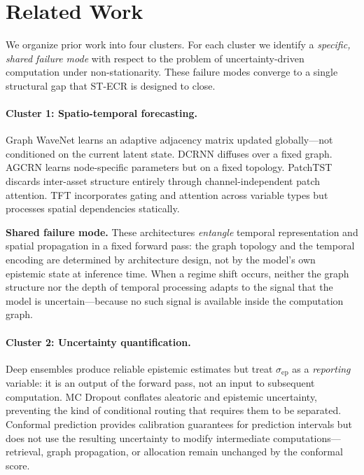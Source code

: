 \documentclass[11pt,a4paper]{article}
\newcommand{\sep}{\sigma_{\mathrm{ep}}}
\begin{document}
\section{Related Work}
\label{sec:related}

We organize prior work into four clusters.  For each cluster we identify a
\emph{specific, shared failure mode} with respect to the problem of
uncertainty-driven computation under non-stationarity.  These failure modes
converge to a single structural gap that ST-ECR is designed to close.

\paragraph{Cluster 1: Spatio-temporal forecasting.}
Graph WaveNet \citep{wu2019gwn} learns an adaptive adjacency matrix updated
globally—not conditioned on the current latent state.
DCRNN \citep{li2018dcrnn} diffuses over a fixed graph.
AGCRN \citep{bai2020agcrn} learns node-specific parameters but on a fixed
topology.  PatchTST \citep{nie2022patchtst} discards inter-asset structure
entirely through channel-independent patch attention.
TFT \citep{lim2021tft} incorporates gating and attention across variable types
but processes spatial dependencies statically.

\textbf{Shared failure mode.}
These architectures \emph{entangle} temporal representation and spatial
propagation in a fixed forward pass: the graph topology and the temporal
encoding are determined by architecture design, not by the model's own
epistemic state at inference time.  When a regime shift occurs, neither the
graph structure nor the depth of temporal processing adapts to the signal
that the model is uncertain—because no such signal is available inside the
computation graph.

\paragraph{Cluster 2: Uncertainty quantification.}
Deep ensembles \citep{lakshminarayanan2017simple} produce reliable epistemic
estimates but treat $\sep$ as a \emph{reporting} variable: it is an output
of the forward pass, not an input to subsequent computation.
MC Dropout \citep{gal2016uncertainty} conflates aleatoric and epistemic
uncertainty, preventing the kind of conditional routing that requires them
to be separated.
Conformal prediction \citep{vovk2005algorithmic,gibbs2021adaptive} provides
calibration guarantees for prediction intervals but does not use the
resulting uncertainty to modify intermediate computations—retrieval,
graph propagation, or allocation remain unchanged by the conformal score.
\end{document}
